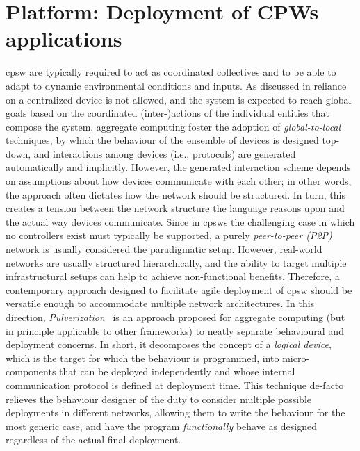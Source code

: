 \chapter{Platform: Deployment of CPWs applications}\label{chap:eng:multitier}%
\minitoc%
%
\newcommand{\scalaloci}{{ScalaLoci}}
\newcommand{\scafiloci}{{ScaFiLoci}}
\newcommand{\scalainline}[1]{\texttt{#1}}
\ac{cpsw} are typically required 
 to act as coordinated collectives
 and to be able to adapt to dynamic
 environmental conditions and inputs.
%
%
As discussed in  reliance on a centralized device is not allowed,
and the system is expected to reach global goals based 
 on the coordinated (inter-)actions of the individual entities that compose the system.
aggregate computing foster the adoption of \emph{global-to-local} techniques,
by which the behaviour of the ensemble of devices is designed top-down,
and interactions among devices (i.e., protocols) are generated automatically and implicitly.
%
However, the generated interaction scheme depends on assumptions about how devices communicate with each other;
in other words, the approach often dictates how the network should be structured.
%
In turn, this creates a tension between the network structure the language reasons upon and the actual way devices communicate.
%
Since in \acp{cpsw} the challenging case in which no controllers exist must typically be supported, 
 a purely \emph{peer-to-peer (P2P)} network is usually considered the paradigmatic setup.
%
However, real-world networks are usually structured hierarchically, 
 and the ability to target multiple infrastructural setups can help to achieve non-functional benefits.
%
Therefore, a contemporary approach designed to facilitate agile deployment of \ac{cpsw} should be versatile enough to accommodate multiple network architectures.
In this direction, \emph{Pulverization}~\cite{DBLP:journals/fi/CasadeiPPVW20}
 is an approach proposed for aggregate computing 
 (but in principle applicable to other frameworks) 
 to neatly separate behavioural and deployment concerns.
%
In short, it decomposes the concept of a \emph{logical device}, 
 which is the target for which the behaviour is programmed,
 into micro-components that can be deployed independently
 and whose internal communication protocol is defined at deployment time.
%
This technique de-facto relieves the behaviour designer of the duty 
 to consider multiple possible  deployments in different networks, 
 allowing them to write the behaviour for the most generic case, 
 and have the program \emph{functionally} behave as designed regardless of the actual final deployment.

